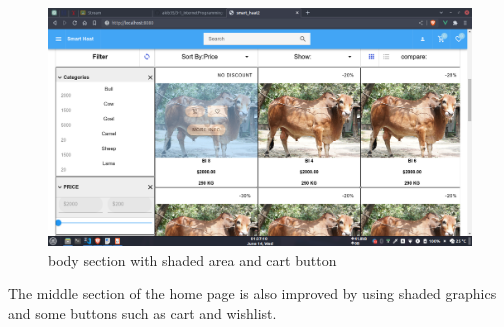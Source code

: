 \documentclass[a4paper,12pt]{report}
\begin{document}
\begin{figure}[H]
	\includegraphics[keepaspectratio, width=\linewidth]{body.png}
	\caption{body section with shaded area and cart button}
	\label{body}
\end{figure}
The middle section of the home page is also improved by using shaded graphics and some buttons such as cart and wishlist.
\end{document}
